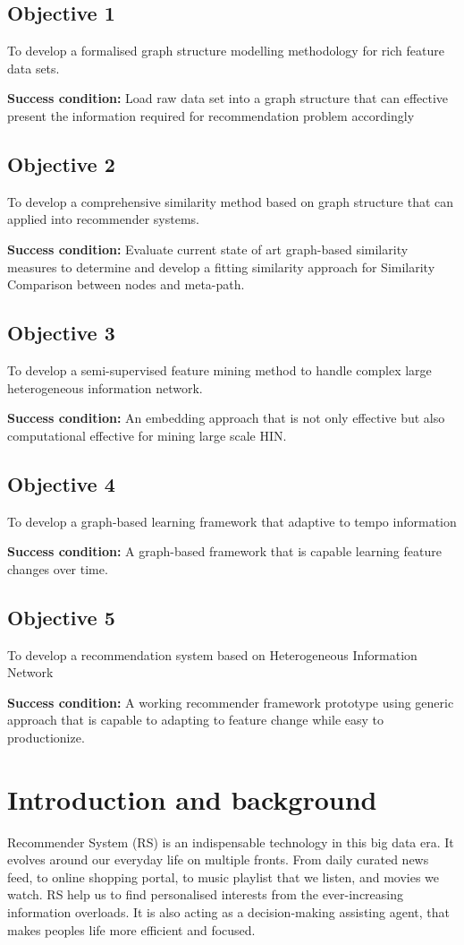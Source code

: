 \documentclass[12pt,a4 paper,title page]{article}
\begin{document}
\subsection{Objective 1}
To develop a formalised graph structure modelling methodology for rich feature data sets. 

\textbf{Success condition:} Load raw data set into a graph structure that can effective present the information required for recommendation problem accordingly 

\subsection{Objective 2} 
To develop a comprehensive similarity method based on graph structure that can applied into recommender systems. 

\textbf{Success condition:} Evaluate current state of art graph-based similarity measures to determine and develop a fitting similarity approach for Similarity Comparison between nodes and meta-path. 

\subsection{Objective 3}
To develop a semi-supervised feature mining method to handle complex large heterogeneous information network. 

\textbf{Success condition:} An embedding approach that is not only effective but also computational effective for mining large scale HIN. 

\subsection{Objective 4} 
To develop a graph-based learning framework that adaptive to tempo information 

\textbf{Success condition:} A graph-based framework that is capable learning feature changes over time. 

\subsection{Objective 5} 
To develop a recommendation system based on Heterogeneous Information Network 

\textbf{Success condition:} A working recommender framework prototype using generic approach that is capable to  adapting to feature change while easy to productionize.  


\section{Introduction and background}
Recommender System (RS) is an indispensable technology in this big data era. It evolves around our everyday life on multiple fronts. From daily curated news feed, to online shopping portal, to music playlist that we listen, and movies we watch. RS help us to find personalised interests from the ever-increasing information overloads. It is also acting as a decision-making assisting agent, that makes peoples life more efficient and focused. 
\end{document}

